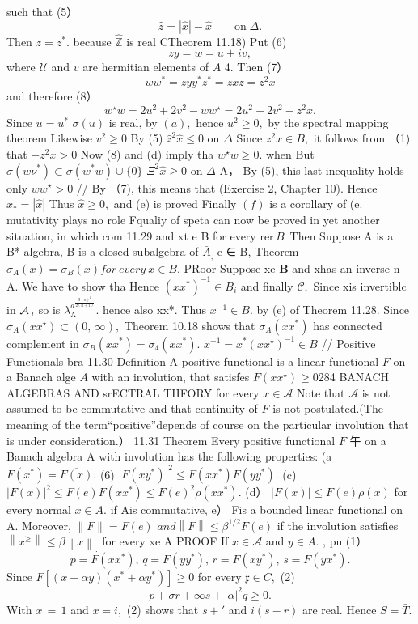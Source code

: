 such that (5） $$ \hat{z}=|\hat{x}|-\hat{x}\qquad\mathrm{on}\;\Delta. $$ Then $z=z^{*}.$ because $\hat{\mathbb{Z}}$ is real CTheorem 11.18) Put (6) $$ z y=w=u+i v, $$ where ${\mathcal{U}}$ and $\boldsymbol{\mathit{v}}$ are hermitian elements of $\textstyle A$ 4. Then (7） $$ w w^{*}=z y y^{*}z^{*}=z x z=z^{2}x $$ and therefore (8） $$ w^{\star}w=2u^{2}+2v^{2}-w w^{\star}=2u^{2}+2v^{2}-z^{2}x. $$ Since $u=u^{*}$ $\sigma(u)$ is real, by $\scriptstyle(a),$ hence $u^{2}\geq0,$ by the spectral mapping theorem Likewise $v^{2}\geq0$ By (5) $\hat{z}^{2}\hat{x}\leq0$ on $\Delta$ Since $z^{2}x\in B,$ it follows from （1) that $-z^{2}x>0$ Now (8) and (d) imply tha $w^{\star}w\geq0.$ when But $\sigma(w\nu^{*})\subset\sigma(w^{*}w)\cup\{0\}$ $\Xi^{2}{\hat{x}}\geq0$ on $\Delta$ A， By (5), this last inequality holds only $w w^{\star}>0$ // By （7), this means that (Exercise 2, Chapter 10). Hence ${\hat{x}}_{*}=|{\hat{x}}|$ Thus ${\hat{x}}\geq0,$ and (e) is proved Finally $\left(f\right)$ is a corollary of (e. mutativity plays no role Fqualiy of speta can now be proved in yet another situation, in which com 11.29 and xt e B for every $\mathrm{rer}\,B\,$ Then Suppose A is a B*-algebra, B is a closed subalgebra of ${\bar{A}}_{\mathrm{,}}$ e ∈ B, Theorem $\sigma_{A}(x)=\sigma_{B}(x)f o r\ e v e r y\ x\in B.$ PRoor Suppose xe $\boldsymbol{B}$ and xhas an inverse n A. We have to show tha Hence $(x x^{*})^{-1}\in B_{i}$ and finally ${\mathcal{C}},$ Since xis invertiblc in ${\cal A}\,,$ so is $\lambda_{\mathrm{\Lambda}}^{a^{\frac{3(n)^{2}}{2(n+1)}}}.$ hence also xx*. Thus $x^{-1}\in B.$ by (e) of Theorem 11.28. Since $\sigma_{A}(x x^{\star})\subset(0,\,\infty),$ Theorem 10.18 shows that $\sigma_{A}(x x^{*})$ has connected complement in $\sigma_{B}(x x^{*})=\sigma_{4}(x x^{*}).$ $x^{-1}=x^{*}(x x^{\star})^{-1}\in B$ // Positive Functionals bra 11.30 Definition A positive functional is a linear functional ${\mathbf{}}F$ on a Banach alge $\scriptstyle A$ with an involution, that satisfes $F(x x^{\star})\geq0$284 BANACH ALGEBRAS AND srECTRAL THFORY for every $x\in{\mathcal{A}}$ Note that $\textstyle{\mathcal{A}}$ is not assumed to be commutative and that continuity of ${\mathbf{}}F$ is not postulated.(The meaning of the term“positive”depends of course on the particular involution that is under consideration.） 11.31 Theorem Every positive functional ${\mathbf{}}F$ 午 on a Banach algebra A with involution has the following properties: (a $F(x^{*})={\overline{{F(x)}}}.$ (6) $|F(x y^{*})|^{2}\leq F(x x^{*})F(y y^{*}).$ (c) $|F(x)|^{2}\leq F(e)F(x x^{*})\leq F(e)^{2}\rho(x x^{*}).$ (d） $|F(x)|\leq F(e)\rho(x)$ for every normal $x\in A.$ if Ais commutative, e） Fis a bounded linear functional on A. Moreover, $\|F\|=F(e)$ $a n d\left\|F\right\|\leq\beta^{1/2}F(e)$ if the involution satisfies $\left\|x^{\geq}\right\|\leq\beta\left\|x\right\|_{.}$ for every xe A PROOF If $x\in{\mathcal{A}}$ and $y\in A.$ , pu (1） $$ p=F(x x^{\ast}),\,q=F(y y^{\ast}),\,r=F(x y^{\ast}),\,s=F(y x^{\ast}). $$ Since $F[(x+\alpha y)(x^{\ast}+\bar{\alpha}y^{\ast})]\geq0$ for every ${\mathfrak{x}}\in C,$ (2) $$ p+\bar{\sigma}r+\infty s+|\alpha|^{2}q\geq0. $$ With $\scriptstyle x\,=\,1$ and $x=i,$ (2) shows that $\textstyle s+\prime$ and $i(s-r)$ are real. Hence $S={\bar{T}}.$ 